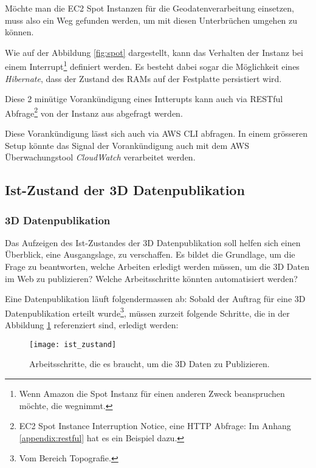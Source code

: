 Möchte man die EC2 Spot Instanzen für die Geodatenverarbeitung einsetzen, muss also ein Weg gefunden werden, um mit diesen Unterbrüchen umgehen zu können.

Wie auf der Abbildung \ref{fig:spot} dargestellt, kann das Verhalten der Instanz bei einem Interrupt\footnote{Wenn Amazon die Spot Instanz für einen anderen Zweck beanspruchen möchte, die wegnimmt.} definiert werden. Es besteht dabei sogar die Möglichkeit eines \emph{Hibernate}, dass der Zustand des RAMs auf der Festplatte persistiert wird.

Diese 2 minütige Vorankündigung eines Intterupts kann auch via RESTful Abfrage\footnote{EC2 Spot Instance Interruption Notice, eine HTTP Abfrage: Im Anhang \ref{appendix:restful} hat es ein Beispiel dazu.} von der Instanz aus abgefragt werden.

Diese Vorankündigung lässt sich auch via AWS CLI abfragen. In einem grösseren Setup könnte das Signal der Vorankündigung auch mit dem AWS Überwachungstool \emph{CloudWatch} verarbeitet werden.


\subsection{Ist-Zustand der 3D Datenpublikation}
\subsubsection{3D Datenpublikation}
Das Aufzeigen des Ist-Zustandes der 3D Datenpublikation soll helfen sich einen Überblick, eine Ausgangslage, zu verschaffen. Es bildet die Grundlage, um die Frage zu beantworten, welche Arbeiten erledigt werden müssen, um die 3D Daten im Web zu publizieren? Welche Arbeitsschritte könnten automatisiert werden? 

Eine Datenpublikation läuft folgendermassen ab: Sobald der Auftrag für eine 3D Datenpublikation erteilt wurde\footnote{Vom Bereich Topografie.}, müssen zurzeit folgende Schritte, die in der Abbildung \ref{fig:ist_zustand} referenziert sind, erledigt werden:

\begin{figure}[H]
	\centering
	\texttt{[image: ist\_zustand]}
	\caption{Arbeitsschritte, die es braucht, um die 3D Daten zu Publizieren.}
	\label{fig:ist_zustand}
\end{figure}

